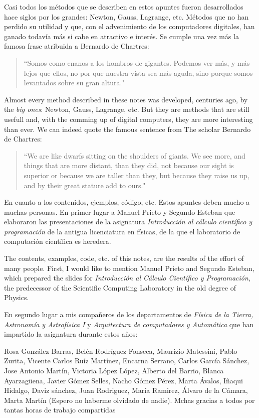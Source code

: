 \begin{paracol}{2}
\switchcolumn         
Casi todos los métodos que se describen en estos apuntes fueron desarrollados hace siglos por los grandes: Newton, Gauss, Lagrange, etc.  Métodos que no han perdido su utilidad y que, con el advenimiento de los computadores digitales, han ganado todavía más si cabe en atractivo e interés. Se cumple una vez más la famosa frase atribuida a Bernardo de Chartres:
\begin{quote}
``Somos como enanos a los hombros de gigantes. Podemos ver más, y más lejos que ellos, no por que nuestra vista sea más aguda, sino porque somos levantados sobre su gran altura."
\end{quote}
\switchcolumn
Almost every method described in these notes was developed, centuries ago, by the \emph{big ones}: Newton, Gauss, Lagrange, etc. But they are methods that are still usefull and, with the comming up of digital computers, they are more interesting than ever. We can indeed quote the famous sentence from The scholar Bernardo de Chartres:
\begin{quote}
``We are like dwarfs sitting on the shoulders of giants. We see more, and things that are more distant, than they did, not because our sight is superior or because we are taller than they, but because they raise us up, and by their great stature add to ours."
\end{quote}          

\switchcolumn
En cuanto a los contenidos, ejemplos, código, etc. Estos apuntes deben mucho a muchas personas. En primer lugar a Manuel Prieto y Segundo Esteban que elaboraron las presentaciones de la asignatura \emph{Introducción al cálculo científico y programación} de la antigua licenciatura en físicas, de la que el laboratorio de computación científica es heredera. 

\switchcolumn
The contents, examples, code, etc. of this notes, are the results of the effort of many people. First, I would like to mention  Manuel Prieto and Segundo Esteban, which prepared the slides for \emph{Introducción al Cálculo Científico y Programación}, the predecessor of the Scientific Computing Laboratory in the old degree of Physics.  

\switchcolumn
En segundo lugar a mis compañeros de los departamentos de  \emph{Física de la Tierra, Astronomía y Astrofísica I} y  \emph{Arquitectura de computadores y Automática} que han impartido la asignatura durante estos años: 

Rosa González Barras, Belén Rodríguez Fonseca, Maurizio Matessini, Pablo Zurita, Vicente Carlos Ruíz Martínez, Encarna Serrano, Carlos García Sánchez, Jose Antonio Martín, Victoria López López,  Alberto del Barrio, Blanca Ayarzagüena, Javier Gómez Selles, Nacho Gómez Pérez, Marta Ávalos, Iñaqui Hidalgo, Daviz sánchez,  Juan Rodriguez, María Ramirez, Álvaro de la Cámara, Marta Martín (Espero no haberme olvidado de nadie). Mchas gracias a todos por tantas horas de trabajo compartidas


\end{paracol}

